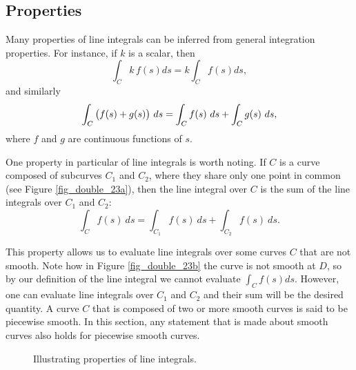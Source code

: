 \subsection{Properties}
Many properties of line integrals can be inferred from general integration properties. For instance, if $k$ is a scalar, then 
$$\int_C k\,f(s)ds = k\int_Cf(s)ds,$$
and similarly
$$\displaystyle \int_C\big(f(s)+g(s)\big)\ ds = \int_Cf(s)\ ds +\int_Cg(s)\ ds,$$
where $f$ and $g$ are continuous functions of $s$.

One property in particular of line integrals is worth noting. If $C$ is a curve composed of subcurves $C_1$ and $C_2$, where they share only one point in common (see Figure \ref{fig_double_23a}), then the line integral over $C$ is the sum of the line integrals over $C_1$ and $C_2$: 
$$\int_Cf(s)\ ds = \int_{C_1}f(s)\ ds+\int_{C_2}f(s)\ ds.$$




This property allows us to evaluate line integrals over some curves $C$ that are not smooth. Note how in Figure \ref{fig_double_23b} the curve is not smooth at $D$, so by our definition of the line integral we cannot evaluate $\int_C f(s)ds$. However, one can evaluate line integrals over $C_1$ and $C_2$ and their sum will be the desired quantity. A curve $C$ that is composed of two or more smooth curves is said to be piecewise smooth. In this section, any statement that is made about smooth curves also holds for piecewise smooth curves.

\begin{figure}[H]
\centering
\qquad
{}
\caption{Illustrating properties of line integrals.}
\end{figure}


